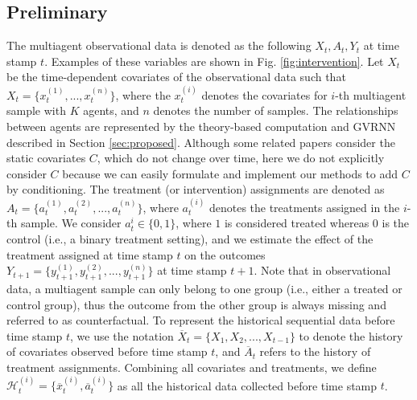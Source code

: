 \documentclass[journal]{IEEEtran}
\begin{document}
\subsection{Preliminary}
The multiagent observational data is denoted as the following $X_t, A_t, Y_t$ at time stamp $t$. %
Examples of these variables are shown in Fig. \ref{fig:intervention}\textcolor{black}{.}
Let $X_t$ be the time-dependent covariates of the observational data such that $X_t=\{x^{(1)}_{t},...,x^{(n)}_{t}\}$, where the $x^{(i)}_{t}$ denotes the covariates for $i$-th multiagent sample with $K$ agents, and $n$ denotes the number of samples. %
The relationships between agents are represented by the theory-based computation and GVRNN described in Section \ref{sec:proposed}. 
Although some related papers \cite{bica2020estimating,liu2020estimating} consider the static covariates $C$, %
which do not change over time, here we do not explicitly consider $C$ because we can easily formulate and implement our methods to add $C$ by conditioning. 
The treatment (or intervention) assignments are denoted as $A_{t}=\{a^{(1)}_{t},a^{(2)}_{t},...,a^{(n)}_{t}\}$, where $a^{(i)}_{t}$ denotes the treatments assigned in the $i$-th sample. %
We consider $a^{i}_{t}\in\{0, 1\}$, where $1$ is considered treated whereas $0$ is the control (i.e., a binary treatment setting), and we estimate the effect of the treatment assigned at time stamp $t$ on the outcomes $Y_{t+1}=\{y^{(1)}_{t+1},y^{(2)}_{t+1},...,y^{(n)}_{t+1}\}$ at time stamp $t+1$.
Note that in observational data, a multiagent sample can only belong to one group (i.e., either a treated or control group), thus the outcome from the other group is always missing and referred to as counterfactual.
To represent the historical sequential data before time stamp $t$, we use the notation $\overline{X}_{t}=\{X_{1},X_{2},...,X_{t-1}\}$ to denote the history of covariates observed before time stamp $t$, and $\overline{A}_{t}$ refers to the history of treatment assignments. Combining all covariates and treatments, we define $\mathcal{H}^{(i)}_{t}=\{\overline{x}^{(i)}_{t},\overline{a}^{(i)}_{t}\}$ as all the historical data collected before time stamp $t$. %
\end{document}
